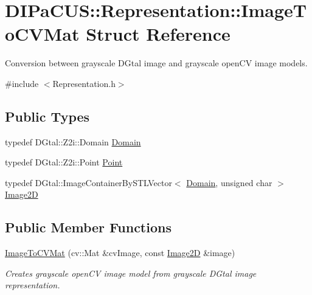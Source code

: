 \hypertarget{structDIPaCUS_1_1Representation_1_1ImageToCVMat}{}\section{D\+I\+Pa\+C\+US\+:\+:Representation\+:\+:Image\+To\+C\+V\+Mat Struct Reference}
\label{structDIPaCUS_1_1Representation_1_1ImageToCVMat}


Conversion between grayscale D\+Gtal image and grayscale open\+CV image models.  




{\ttfamily \#include $<$Representation.\+h$>$}

\subsection*{Public Types}
\begin{DoxyCompactItemize}
\item 
typedef D\+Gtal\+::\+Z2i\+::\+Domain \mbox{\hyperlink{structDIPaCUS_1_1Representation_1_1ImageToCVMat_ab2ddd8fb775a4962089398b3fbbea75c}{Domain}}
\item 
typedef D\+Gtal\+::\+Z2i\+::\+Point \mbox{\hyperlink{structDIPaCUS_1_1Representation_1_1ImageToCVMat_a9add92562bf46f1f3bb8e944bf00e775}{Point}}
\item 
typedef D\+Gtal\+::\+Image\+Container\+By\+S\+T\+L\+Vector$<$ \mbox{\hyperlink{structDIPaCUS_1_1Representation_1_1ImageToCVMat_ab2ddd8fb775a4962089398b3fbbea75c}{Domain}}, unsigned char $>$ \mbox{\hyperlink{structDIPaCUS_1_1Representation_1_1ImageToCVMat_acca980e3cfd7e8980cf058d1e8cfb169}{Image2D}}
\end{DoxyCompactItemize}
\subsection*{Public Member Functions}
\begin{DoxyCompactItemize}
\item 
\mbox{\hyperlink{structDIPaCUS_1_1Representation_1_1ImageToCVMat_ac4c207be38e087d598ff2c59aaa4e353}{Image\+To\+C\+V\+Mat}} (cv\+::\+Mat \&cv\+Image, const \mbox{\hyperlink{structDIPaCUS_1_1Representation_1_1ImageToCVMat_acca980e3cfd7e8980cf058d1e8cfb169}{Image2D}} \&image)
\begin{DoxyCompactList}\small\item\em Creates grayscale open\+CV image model from grayscale D\+Gtal image representation. \end{DoxyCompactList}\end{DoxyCompactItemize}



